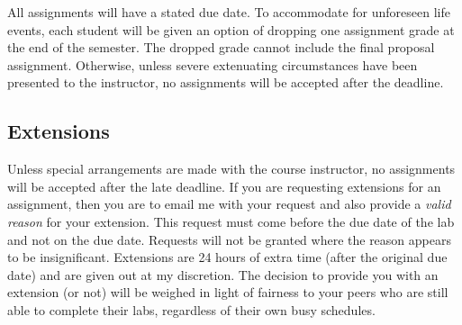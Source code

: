 \documentclass[11pt]{article} %
\begin{document}
All assignments will have a stated due date. To accommodate for unforeseen life events, each student will be given an option of dropping one assignment grade at the end of the semester. The dropped grade cannot include the final proposal assignment. Otherwise, unless severe extenuating circumstances have been presented to the instructor, no assignments will be accepted after the deadline.










\vspace{-.10in}
\subsection*{\textbf{Extensions}}
Unless special arrangements are made with the course instructor, no assignments will be accepted after the late deadline. If you are requesting extensions for an assignment, then you are to email me with your request and also provide a \emph{valid reason} for your extension. This request must come before the due date of the lab and not on the due date. Requests will not be granted where the reason appears to be insignificant. Extensions are 24 hours of extra time (after the original due date) and are given out at my discretion. The decision to provide you with an extension (or not) will be weighed in light of fairness to your peers who are still able to complete their labs, regardless of their own busy schedules. 
\end{document}

